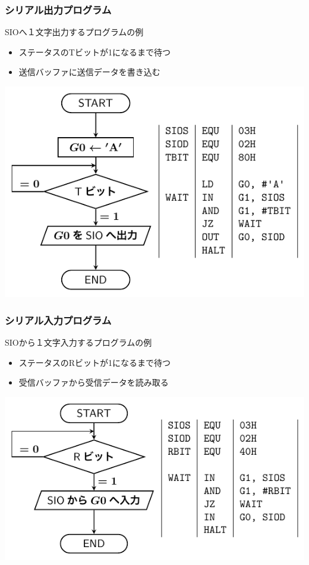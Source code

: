 \documentclass[handout]{beamer}        %
\begin{document}
\begin{frame}
  \frametitle{シリアル出力プログラム}
  SIOへ１文字出力するプログラムの例
  \begin{itemize}
    \item ステータスのTビットが1になるまで待つ
    \item 送信バッファに送信データを書き込む
  \end{itemize}
  \centerline{\includegraphics[scale=0.85]{../Tikz/flow6.pdf}}
\end{frame}

\begin{frame}
  \frametitle{シリアル入力プログラム}
  SIOから１文字入力するプログラムの例
  \begin{itemize}
    \item ステータスのRビットが1になるまで待つ
    \item 受信バッファから受信データを読み取る
  \end{itemize}
  \centerline{\includegraphics[scale=0.85]{../Tikz/flow7.pdf}}
\end{frame}
\end{document}

